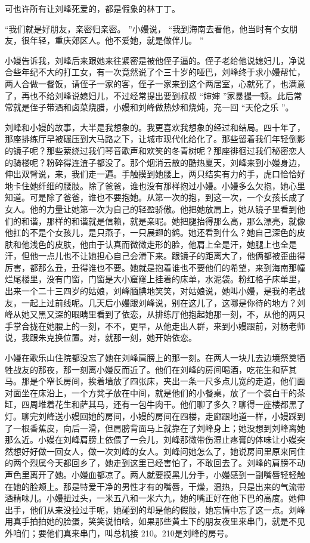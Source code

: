\documentclass[12pt,twoside,openany]{book}
\begin{document}
可也许所有让刘峰死爱的，都是假象的林丁丁。

“我们就是好朋友，亲密归亲密。 ”小嫚说， “我到海南去看他，他当时有个女朋友，很年轻，重庆郊区人。他不爱她，就是做伴儿。 ”

小嫚告诉我，刘峰后来跟她来往紧密是被他侄子逼的。侄子老给他说媳妇儿，净说合些年纪不大的打工女，有一次竟然说了个三十岁的哑巴，刘峰终于求小嫚帮忙，两人合做一餐饭，请侄子一家的客，侄子一家来到这个两居室，心就死了，也满意了，再也不给刘峰说媳妇儿，不过经常提出要到叔叔 “婶婶 ”家暴撮一顿。此后常常就是侄子带酒和卤菜烧腊，小嫚和刘峰做热炒和烧炖，充一回 “天伦之乐 ”。

刘峰和小嫚的故事，大半是我想象的。我更喜欢我想象的经过和结局。四十年了，那座排练厅早被碾压到大马路之下，让城市现代化给化了。那些留着我们年轻倒影的镜子呢？那些萦绕过我们琴音歌声和欢笑的冬青树呢？那座徘徊过我们秘密恋人的骑楼呢？粉碎得连渣子都没了。那个烟消云散的酷热夏天，刘峰来到小嫚身边，伸出双臂说，来，我们走一遍。手触摸到她腰上，两只结实有力的手，虎口恰恰好地卡住她纤细的腰肢。除了爸爸，谁也没有那样抱过小嫚。小嫚多么欠抱，她心里知道。可是除了爸爸，谁也不要抱她。从第一次的抱，到这一次，一个女孩长成了女人。他的力量让她第一次为自己的轻盈骄傲。他把她放肩上，她从镜子里看到他们的和谐，那样的和谐就是信赖，就是亲昵。她把腿抬得那么高，那么漂亮，就像他扛的不是个女孩儿，是只燕子，一只展翅的鹤。她还看到什么？她自己深色的皮肤和他浅色的皮肤，他由于认真而微微走形的脸，他肩上全是汗，她腿上也全是汗，但他一点儿也不让她担心自己会滑下来。跟镜子的距离大了，他俩都被歪曲得厉害，都那么丑，丑得谁也不要。她就是抱着谁也不要他们的希望，来到海南那幢烂尾楼里，没有门窗，门窗是大小窟窿上挂着的床单，水泥袋。粉红格子床单里，出来一个二十三四岁的姑娘，刘峰腼腆地笑笑，对姑娘说，她叫小嫚，是我的老战友，一起上过前线呢。几天后小嫚跟刘峰说，别在这儿了，这哪是你待的地方？刘峰从她又黑又深的眼睛里看到了依恋，从排练厅他抱起她那一刻，不，从他的两只手掌合拢在她腰上的一刻，不不，更早，从他走出人群，来到小嫚跟前，对杨老师说，我跟朱克换位置。对，就那一刻，她开始依恋。

小嫚在歌乐山住院都没忘了她在刘峰肩膀上的那一刻。在两人一块儿去边境祭奠牺牲战友的那夜，那一刻离小嫚反而近了。他们在刘峰的房间喝酒，吃花生和萨其马。那是个窄长房间，挨着墙放了四张床，夹出一条一尺多点儿宽的走道，他们面对面坐在床沿上，一个方凳子放在中间，就是他们的小餐桌，放了一个装白干的茶缸，四周堆着花生和萨其马，还有一包牛肉干。他们聊了多久？聊得一座楼都黑了灯。聊完刘峰送小嫚回她的房间，小嫚的房间在四楼，走廊跟地道一样，小嫚踩到了一根香蕉皮，向后一滑，但肩膀背面马上就靠在了刘峰身上；她没想到刘峰离她那么近。小嫚在刘峰肩膀上依偎了一会儿，刘峰那微带伤湿止疼膏的体味让小嫚突然想好好做一回女人，做一次刘峰的女人。刘峰问她怎么了，她说房间里原来同住的两个烈属今天都回乡了，她走到这里已经害怕了，不敢回去了。刘峰的肩膀不动声色里离开了她。小嫚血都凉了。两人就要摸黑儿分手，小嫚感到一副嘴唇轻轻触在她的脸颊上。那是特爱干净的男性才有的嘴唇，干燥，温热，只是出来的气流带酒精味儿。小嫚扭过头，一米五八和一米六九，她的嘴正好在他下巴的高度。她伸出手，他们从来没拉过手呢，她碰到的却是他的假肢，她忘情中忘了这一点。刘峰用真手拍拍她的脸蛋，笑笑说怕啥，如果那些黄土下的朋友夜里来串门，就是不见外咱们；要他们真来串门，叫总机接 210。210是刘峰的房号。
\end{document}
